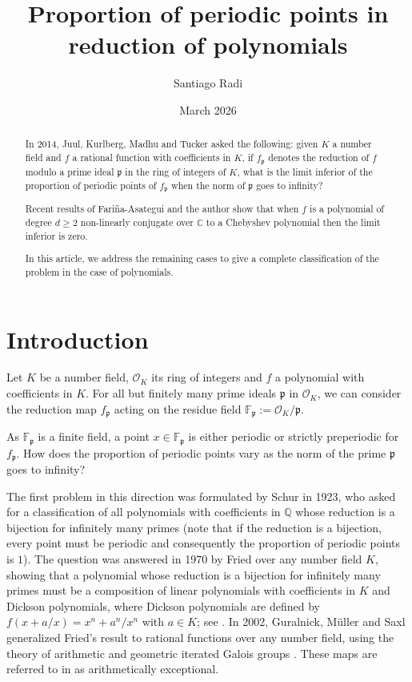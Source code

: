 \documentclass{amsart}
\title{Proportion of periodic points in reduction of polynomials}
\author{Santiago Radi}
\date{March 2026}
\def\QQ{\mathbb Q}
\def\OK{\mathcal{O}_K}
\def\FF{\mathbb F}
\def\CC{\mathbb C}
\theoremstyle{definition}
\begin{document}
\begin{abstract}
In 2014, Juul, Kurlberg, Madhu and Tucker asked the following: given $K$ a number field and $f$ a rational function with coefficients in $K$, if $f_\mathfrak{p}$ denotes the reduction of $f$ modulo a prime ideal $\mathfrak{p}$ in the ring of integers of $K$, what is the limit inferior of the proportion of periodic points of $f_\mathfrak{p}$ when the norm of $\mathfrak{p}$ goes to infinity? 

Recent results of Fariña-Asategui and the author show that when $f$ is a polynomial of degree $d \geq 2$ non-linearly conjugate over $\CC$ to a Chebyshev polynomial then the limit inferior is zero.  

In this article, we address the remaining cases to give a complete classification of the problem in the case of polynomials.
\end{abstract}

\maketitle

\section{Introduction}

Let $K$ be a number field, $\OK$ its ring of integers and $f$ a polynomial with coefficients in $K$. For all but finitely many prime ideals $\mathfrak{p}$ in $\OK$, we can consider the reduction map $f_\mathfrak{p}$ acting on the residue field $\FF_\mathfrak{p} := \OK/\mathfrak{p}$. 

As $\FF_\mathfrak{p}$ is a finite field, a point $x \in \FF_\mathfrak{p}$ is either periodic or strictly preperiodic for $f_\mathfrak{p}$. How does the proportion of periodic points vary as the norm of the prime $\mathfrak{p}$ goes to infinity? 

The first problem in this direction was formulated by Schur in 1923, who asked for a classification of all polynomials with coefficients in $\QQ$ whose reduction is a bijection for infinitely many primes \cite{Schur1923} (note that if the reduction is a bijection, every point must be periodic and consequently the proportion of periodic points is $1$). The question was answered in 1970 by Fried over any number field $K$, showing that a polynomial whose reduction is a bijection for infinitely many primes must be a composition of linear polynomials with coefficients in $K$ and Dickson polynomials, where Dickson polynomials are defined by $f(x+a/x) = x^n + a^n/x^n$ with $a \in K$; see \cite{Fried1970}. In 2002, Guralnick, Müller and Saxl generalized Fried's result to rational functions over any number field, using the theory of arithmetic and geometric iterated Galois groups \cite{GuralnickMullerSaxl2003}. These maps are referred to in \cite{GuralnickMullerSaxl2003} as arithmetically exceptional.
\end{document}
